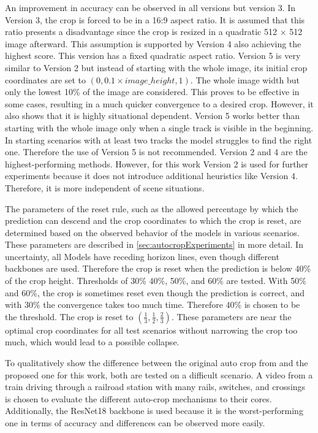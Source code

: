 \noindnet An improvement in accuracy can be observed in all versions but version 3.
In Version 3, the crop is forced to be in a 16:9 aspect ratio.
It is assumed that this ratio presents a disadvantage since the crop is resized in a quadratic 512 $\times$ 512 image afterward.
This assumption is supported by Version 4 also achieving the highest score.
This version has a fixed quadratic aspect ratio.
Version 5 is very similar to Version 2 but instead of starting with the whole image, its initial crop coordinates are set to $(0, 0.1 \times image\_height, 1)$.
The whole image width but only the lowest 10\% of the image are considered.
This proves to be effective in some cases, resulting in a much quicker convergence to a desired crop.
However, it also shows that it is highly situational dependent.
Version 5 works better than starting with the whole image only when a single track is visible in the beginning.
In starting scenarios with at least two tracks the model struggles to find the right one. Therefore the use of Version 5 is not recommended.
Version 2 and 4 are the highest-performing methods.
However, for this work Version 2 is used for further experiments because it does not introduce additional heuristics like Version 4.
Therefore, it is more independent of scene situations.

The parameters of the reset rule, such as the allowed percentage by which the prediction can descend and the crop coordinates to which the crop is reset, are determined based on the observed behavior of the models in various scenarios.
These parameters are described in \autoref{sec:autocropExperiments} in more detail.
In uncertainty, all Models have receding horizon lines, even though different backbones are used.
Therefore the crop is reset when the prediction is below 40\% of the crop height.
Thresholds of 30\% 40\%, 50\%, and 60\% are tested.
With 50\% and 60\%, the crop is sometimes reset even though the prediction is correct, and with 30\% the convergence takes too much time.
Therefore 40\% is chosen to be the threshold.
The crop is reset to $(\frac{1}{3}, \frac{1}{2}, \frac{2}{3})$.
These parameters are near the optimal crop coordinates for all test scenarios without narrowing the crop too much, which would lead to a possible collapse.

\vspace{0.5cm}

\noindent To qualitatively show the difference between the original auto crop from \cite{tepNet2024} and the proposed one for this work, both are tested on a difficult scenario.
A video from a train driving through a railroad station with many rails, switches, and crossings is chosen to evaluate the different auto-crop mechanisms to their cores.
Additionally, the ResNet18 backbone is used because it is the worst-performing one in terms of accuracy and differences can be observed more easily.


